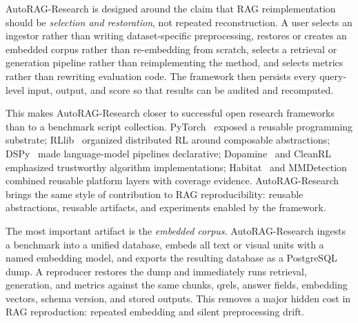 \documentclass{article}
\newcommand{\framework}{AutoRAG-Research}
\begin{document}
\framework{} is designed around the claim that RAG reimplementation should be \emph{selection and restoration}, not repeated reconstruction. A user selects an ingestor rather than writing dataset-specific preprocessing, restores or creates an embedded corpus rather than re-embedding from scratch, selects a retrieval or generation pipeline rather than reimplementing the method, and selects metrics rather than rewriting evaluation code. The framework then persists every query-level input, output, and score so that results can be audited and recomputed.

This makes \framework{} closer to successful open research frameworks than to a benchmark script collection. PyTorch~\citep{paszke2019pytorch} exposed a reusable programming substrate; RLlib~\citep{liang2018rllib} organized distributed RL around composable abstractions; DSPy~\citep{khattab2024dspy} made language-model pipelines declarative; Dopamine~\citep{castro2018dopamine} and CleanRL~\citep{huang2022cleanrl} emphasized trustworthy algorithm implementations; Habitat~\citep{savva2019habitat} and MMDetection~\citep{chen2019mmdetection} combined reusable platform layers with coverage evidence. \framework{} brings the same style of contribution to RAG reproducibility: reusable abstractions, reusable artifacts, and experiments enabled by the framework.

The most important artifact is the \emph{embedded corpus}. \framework{} ingests a benchmark into a unified database, embeds all text or visual units with a named embedding model, and exports the resulting database as a PostgreSQL dump. A reproducer restores the dump and immediately runs retrieval, generation, and metrics against the same chunks, qrels, answer fields, embedding vectors, schema version, and stored outputs. This removes a major hidden cost in RAG reproduction: repeated embedding and silent preprocessing drift.
\end{document}
